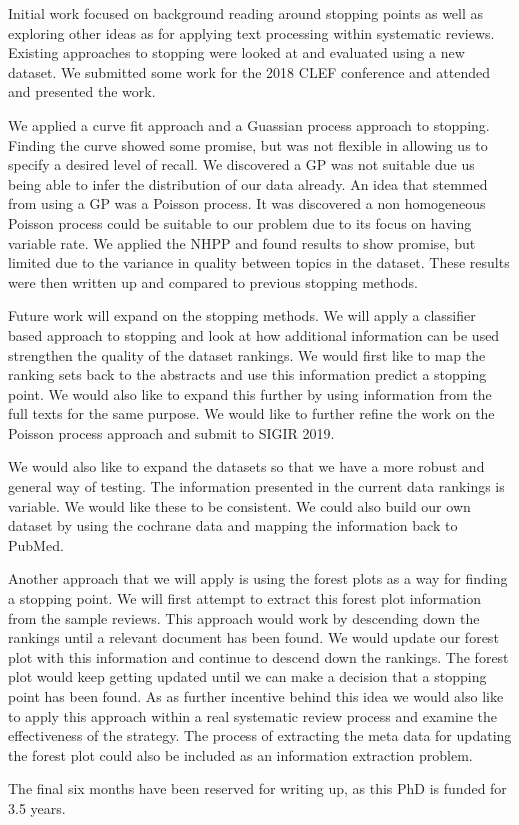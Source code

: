 Initial work focused on background reading around stopping points as well as exploring other ideas as for applying text processing within systematic reviews. Existing approaches to stopping were looked at and evaluated using a new dataset. We submitted some work for the 2018 CLEF conference and attended and presented the work.

We applied a curve fit approach and a Guassian process approach to stopping. Finding the curve showed some promise, but was not flexible in allowing us to specify a desired level of recall. We discovered a GP was not suitable due us being able to infer the distribution of our data already.  An idea that stemmed from using a GP was a Poisson process. It was discovered a non homogeneous Poisson process could be suitable to our problem due to its focus on having variable rate. We applied the NHPP and found results to show promise, but limited due to the variance in quality between topics in the dataset. These results were then written up and compared to previous stopping methods.

Future work will expand on the stopping methods. We will apply a classifier based approach to stopping and look at how additional information can be used strengthen the quality of the dataset rankings. We would first like to map the ranking sets back to the abstracts and use this information predict a stopping point. We would also like to expand this further by using information from the full texts for the same purpose. We would like to further refine the work on the Poisson process approach and submit to SIGIR 2019.

We would also like to expand the datasets so that we have a more robust and general way of testing. The information presented in the current data rankings is variable. We would like these to be consistent. We could also build our own dataset by using the cochrane data and mapping the information back to PubMed.

Another approach that we will apply is using the forest plots as a way for finding a stopping point. We will first attempt to extract this forest plot information from the sample reviews. This approach would work by descending down the rankings until a relevant document has been found. We would update our forest plot with this information and continue to descend down the rankings. The forest plot would keep getting updated until we can make a decision that a stopping point has been found. As as further incentive behind this idea we would also like to apply this approach within a real systematic review process and examine the effectiveness of the strategy. The process of extracting the meta data for updating the forest plot could also be included as an information extraction problem.

The final six months have been reserved for writing up, as this PhD is funded for 3.5 years.
